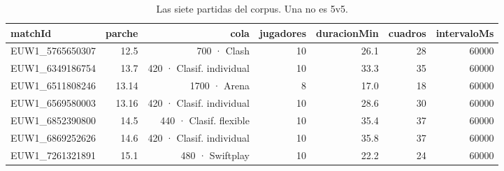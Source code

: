 \begin{table}[H]
\centering
\small
\caption{Las siete partidas del corpus. Una no es 5v5.}
\label{tab:corpus}
\begin{tabular}{lrrrrrr}
\toprule
matchId & parche & cola & jugadores & duracionMin & cuadros & intervaloMs \\
\midrule
EUW1\_5765650307 & 12.5 & 700 · Clash & 10 & 26.1 & 28 & 60000 \\
EUW1\_6349186754 & 13.7 & 420 · Clasif. individual & 10 & 33.3 & 35 & 60000 \\
EUW1\_6511808246 & 13.14 & 1700 · Arena & 8 & 17.0 & 18 & 60000 \\
EUW1\_6569580003 & 13.16 & 420 · Clasif. individual & 10 & 28.6 & 30 & 60000 \\
EUW1\_6852390800 & 14.5 & 440 · Clasif. flexible & 10 & 35.4 & 37 & 60000 \\
EUW1\_6869252626 & 14.6 & 420 · Clasif. individual & 10 & 35.8 & 37 & 60000 \\
EUW1\_7261321891 & 15.1 & 480 · Swiftplay & 10 & 22.2 & 24 & 60000 \\
\bottomrule
\end{tabular}
\end{table}
